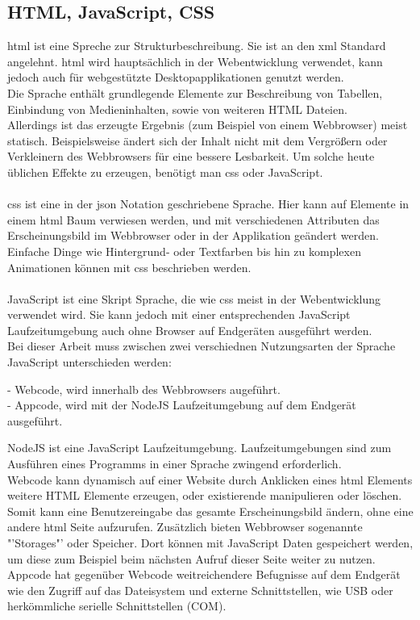 \documentclass[11pt]{scrartcl}
\begin{document}
\subsection{HTML, JavaScript, CSS}
\ac{html} ist eine Spreche zur Strukturbeschreibung. Sie ist an den \ac{xml} Standard angelehnt. \ac{html}
wird hauptsächlich in der Webentwicklung verwendet, kann jedoch auch für webgestützte Desktopapplikationen
genutzt werden.\\
Die Sprache enthält grundlegende Elemente zur Beschreibung von Tabellen, Einbindung von Medieninhalten, sowie
von weiteren HTML Dateien.\\
Allerdings ist das erzeugte Ergebnis (zum Beispiel von einem Webbrowser) meist statisch. Beispielsweise ändert sich
der Inhalt nicht mit dem Vergrößern oder Verkleinern des Webbrowsers für eine bessere Lesbarkeit. Um solche heute
üblichen Effekte zu erzeugen, benötigt man \ac{css} oder JavaScript.\\
\\
\ac{css} ist eine in der \ac{json} Notation geschriebene Sprache. Hier kann auf Elemente in einem \ac{html} Baum
verwiesen werden, und mit verschiedenen Attributen das Erscheinungsbild im Webbrowser oder in der Applikation
geändert werden.\\
Einfache Dinge wie Hintergrund- oder Textfarben bis hin zu komplexen Animationen können mit \ac{css} beschrieben
werden.\\
\\
JavaScript ist eine Skript Sprache, die wie \ac{css} meist in der Webentwicklung verwendet wird. Sie kann jedoch
mit einer entsprechenden JavaScript Laufzeitumgebung auch ohne Browser auf Endgeräten ausgeführt werden.\\
Bei dieser Arbeit muss zwischen zwei verschiednen Nutzungsarten der Sprache JavaScript unterschieden werden:\\
\begin{addmargin}[2em]{0em}
 - Webcode, wird innerhalb des Webbrowsers augeführt.\\
 - Appcode, wird mit der NodeJS Laufzeitumgebung auf dem Endgerät ausgeführt.\\
\end{addmargin}
NodeJS ist eine JavaScript Laufzeitumgebung. Laufzeitumgebungen sind zum Ausführen eines Programms in einer
Sprache zwingend erforderlich.\\
Webcode kann dynamisch auf einer Website durch Anklicken eines \ac{html} Elements weitere HTML Elemente erzeugen,
oder existierende manipulieren oder löschen. Somit kann eine Benutzereingabe das gesamte Erscheinungsbild ändern,
ohne eine andere \ac{html} Seite aufzurufen.
Zusätzlich bieten Webbrowser sogenannte "'Storages"' oder Speicher. Dort können mit JavaScript Daten gespeichert werden,
um diese zum Beispiel beim nächsten Aufruf dieser Seite weiter zu nutzen.\\
Appcode hat gegenüber Webcode weitreichendere Befugnisse auf dem Endgerät wie den Zugriff auf das Dateisystem und
externe Schnittstellen, wie USB oder herkömmliche serielle Schnittstellen (COM).
\clearpage
\end{document}
